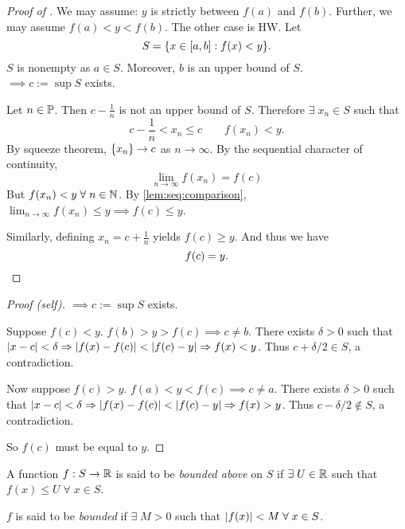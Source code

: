 
\begin{proof}[Proof of ]
    We may assume: $y$ is strictly between $f(a)$ and $f(b)$.
    Further, we may assume $f(a) < y < f(b)$.
    The other case is \textcolor{exercise}{HW}.
    Let \[
        S = \set{x \in [a, b]: f(x) < y}.
    \] $S$ is nonempty as $a \in S$.
    Moreover, $b$ is an upper bound of $S$. \\
    $\implies c := \sup S$ exists. 

    Let $n \in \P$.
    Then $c - \frac{1}{n}$ is not an upper bound of $S$.
    Therefore $\exists\; x_{n} \in S$ such that \[
        c - \frac{1}{n} < x_{n} \leq c \qquad f(x_{n}) < y.
    \] By squeeze theorem, $\set{x_{n}} \to c$ as $n \to \infty$.
    By the sequential character of continuity, \[
        \lim_{n \to \infty} f(x_{n}) = f(c)
    \] But $f(x_{n}) < y \;\forall\; n \in \N$.
    By \cref{lem:seq:comparison}, $\lim_{n \to \infty} f(x_{n}) \leq y \implies f(c) \leq y$.

    Similarly, defining $x_{n} = c + \frac{1}{n}$ yields $f(c) \geq y$. And thus we have \[
        f(c) = y. \qedhere
    \]
\end{proof}

\begin{proof}[Proof \textcolor{self_proof}{(self)}]
    $\implies c := \sup S$ exists.

    Suppose $f(c) < y$.
    $f(b) > y > f(c) \implies c \neq b$.
    There exists $\delta > 0$ such that $\abs{x - c} < \delta \implies \abs{f(x) - f(c)} < \abs{f(c) - y} \implies f(x) < y$.
    Thus $c + \delta/2 \in S$, a contradiction.

    Now suppose $f(c) > y$.
    $f(a) < y < f(c) \implies c \neq a$.
    There exists $\delta > 0$ such that $\abs{x - c} < \delta \implies \abs{f(x) - f(c)} < \abs{f(c) - y} \implies f(x) > y$.
    Thus $c - \delta/2 \not\in S$, a contradiction.

    So $f(c)$ must be equal to $y$.
\end{proof}

\begin{defn} \label{defn:cont:bounded}
    A function $f : S \to \R$ is said to be \emph{bounded above} on $S$ if $\exists\; U \in \R$ such that $f(x) \leq U \;\forall\; x \in S$.

    $f$ is said to be \emph{bounded} if $\exists\; M > 0$ such that $\abs{f(x)} < M \;\forall\; x \in S$.
\end{defn}

